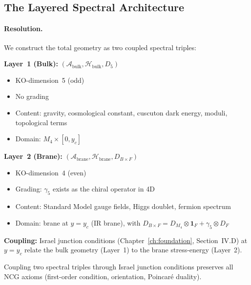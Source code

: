\subsection{The Layered Spectral Architecture}
\label{sec:4-layered}

\paragraph{Resolution.} We construct the total geometry as two coupled spectral triples:

\textbf{Layer~1 (Bulk):} $(\mathcal{A}_{\mathrm{bulk}}, \mathcal{H}_{\mathrm{bulk}}, D_5)$
\begin{itemize}
  \item KO-dimension~5 (odd)
  \item No grading
  \item Content: gravity, cosmological constant, cuscuton dark energy, moduli, topological terms
  \item Domain: $M_4 \times [0, y_c]$
\end{itemize}

\textbf{Layer~2 (Brane):} $(\mathcal{A}_{\mathrm{brane}}, \mathcal{H}_{\mathrm{brane}}, D_{B \times F})$
\begin{itemize}
  \item KO-dimension~4 (even)
  \item Grading: $\gamma_5$ exists as the chiral operator in 4D
  \item Content: Standard Model gauge fields, Higgs doublet, fermion spectrum
  \item Domain: brane at $y = y_c$ (IR brane), with $D_{B \times F} = D_{M_4} \otimes \mathbf{1}_F + \gamma_5 \otimes D_F$
\end{itemize}

\textbf{Coupling:} Israel junction conditions (Chapter~\ref{ch:foundation}, Section~IV.D) at $y = y_c$ relate the bulk geometry (Layer~1) to the brane stress-energy (Layer~2).

\begin{theorem}\label{thm:4-axiom-preservation}
Coupling two spectral triples through Israel junction conditions preserves all NCG axioms (first-order condition, orientation, Poincar\'e duality).
\end{theorem}

